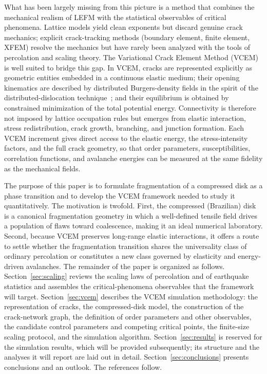 \documentclass[preprint,12pt]{elsarticle}
\begin{document}
What has been largely missing from this picture is a method that combines the
mechanical realism of LEFM with the statistical observables of critical phenomena.
Lattice models yield clean exponents but discard genuine crack mechanics; explicit
crack-tracking methods (boundary element, finite element, XFEM) resolve the mechanics
but have rarely been analyzed with the tools of percolation and scaling theory. The
Variational Crack Element Method (VCEM)~\cite{Ghoniem2026VCEMa,Ghoniem2026VCEMb} is well suited to bridge this gap. In VCEM,
cracks are represented explicitly as geometric entities embedded in a continuous
elastic medium; their opening kinematics are described by distributed Burgers-density
fields in the spirit of the distributed-dislocation
technique~\cite{BilbyEshelby1968,HillsKellyDaiKorsunsky1996}; and their equilibrium is
obtained by constrained minimization of the total potential energy. Connectivity is
therefore not imposed by lattice occupation rules but emerges from elastic
interaction, stress redistribution, crack growth, branching, and junction formation.
Each VCEM increment gives direct access to the elastic energy, the stress-intensity
factors, and the full crack geometry, so that order parameters, susceptibilities,
correlation functions, and avalanche energies can be measured at the same fidelity as
the mechanical fields.

The purpose of this paper is to formulate fragmentation of a compressed disk as a
phase transition and to develop the VCEM framework needed to study it quantitatively.
The motivation is twofold. First, the compressed (Brazilian) disk is a canonical
fragmentation geometry in which a well-defined tensile field drives a population of
flaws toward coalescence, making it an ideal numerical laboratory. Second, because
VCEM preserves long-range elastic interactions, it offers a route to settle whether
the fragmentation transition shares the universality class of ordinary percolation or
constitutes a new class governed by elasticity and energy-driven avalanches. The
remainder of the paper is organized as follows.
Section~\ref{sec:scaling} reviews the scaling laws of percolation and of earthquake
statistics and assembles the critical-phenomena observables that the framework will
target. Section~\ref{sec:vcem} describes the VCEM simulation methodology: the
representation of cracks, the compressed-disk model, the construction of the
crack-network graph, the definition of order parameters and other observables, the
candidate control parameters and competing critical points, the finite-size scaling
protocol, and the simulation algorithm. Section~\ref{sec:results} is reserved for the
simulation results, which will be provided subsequently; its structure and the
analyses it will report are laid out in detail. Section~\ref{sec:conclusions}
presents conclusions and an outlook. The references follow.
\end{document}
